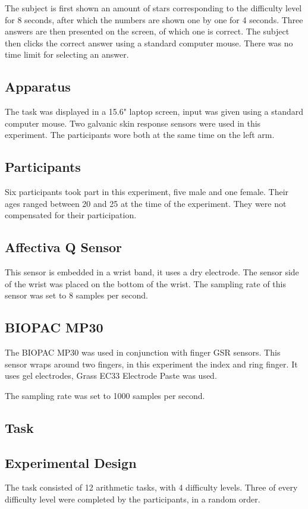 \documentclass[12pt,leqno,letterpaper]{report} %
\begin{document}
The subject is first shown an amount of stars corresponding to the difficulty level for 8 seconds, after which the numbers are shown one by one for 4 seconds. Three answers are then presented on the screen, of which one is correct. The subject then clicks the correct answer using a standard computer mouse. There was no time limit for selecting an answer.


\subsection{Apparatus}
The task was displayed in a 15.6" laptop screen, input was given using a standard computer mouse.
Two galvanic skin response sensors were used in this experiment. The participants wore both at the same time on the left arm.

\subsection{Participants}
Six participants took part in this experiment, five male and one female. Their ages ranged between 20 and 25 at the time of the experiment. They were not compensated for their participation.


\subsection{Affectiva Q Sensor}
This sensor is embedded in a wrist band, it uses a dry electrode. The sensor side of the wrist was placed on the bottom of the wrist. The sampling rate of this sensor was set to 8 samples per second.

\subsection{BIOPAC MP30}
The BIOPAC MP30 was used in conjunction with finger GSR sensors. This sensor wraps around two fingers, in this experiment the index and ring finger. It uses gel electrodes, Grass EC33 Electrode Paste was used.

The sampling rate was set to 1000 samples per second.

\subsection{Task}

\subsection{Experimental Design}
The task consisted of 12 arithmetic tasks, with 4 difficulty levels. Three of every difficulty level were completed by the participants, in a random order. 
\end{document}
